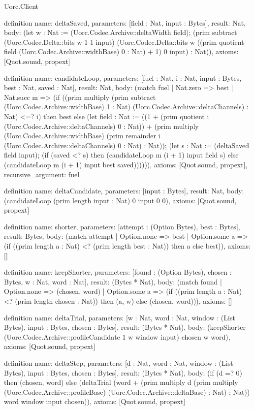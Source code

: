 \begin{lexlean}{Uorc.Client}
\begin{semanticmodule}
definition{
  name: deltaSaved,
  parameters: [field : Nat, input : Bytes],
  result: Nat,
  body: (let w : Nat := (Uorc.Codec.Archive::deltaWidth field); (prim subtract (Uorc.Codec.Delta::bits w 1 1 input) (Uorc.Codec.Delta::bits w ((prim quotient field (Uorc.Codec.Archive::widthBase) 0 : Nat) + 1) 0 input) : Nat)),
  axioms: [Quot.sound, propext]
}

definition{
  name: candidateLoop,
  parameters: [fuel : Nat, i : Nat, input : Bytes, best : Nat, saved : Nat],
  result: Nat,
  body: (match fuel
    | Nat.zero => best
    | Nat.succ m => (if ((prim multiply (prim subtract (Uorc.Codec.Archive::widthBase) 1 : Nat) (Uorc.Codec.Archive::deltaChannels) : Nat) <=? i) then best else (let field : Nat := ((1 + (prim quotient i (Uorc.Codec.Archive::deltaChannels) 0 : Nat)) + (prim multiply (Uorc.Codec.Archive::widthBase) (prim remainder i (Uorc.Codec.Archive::deltaChannels) 0 : Nat) : Nat)); (let s : Nat := (deltaSaved field input); (if (saved <? s) then (candidateLoop m (i + 1) input field s) else (candidateLoop m (i + 1) input best saved)))))),
  axioms: [Quot.sound, propext],
  recursive_argument: fuel
}

definition{
  name: deltaCandidate,
  parameters: [input : Bytes],
  result: Nat,
  body: (candidateLoop (prim length input : Nat) 0 input 0 0),
  axioms: [Quot.sound, propext]
}

definition{
  name: shorter,
  parameters: [attempt : (Option Bytes), best : Bytes],
  result: Bytes,
  body: (match attempt
    | Option.none => best
    | Option.some a => (if ((prim length a : Nat) <? (prim length best : Nat)) then a else best)),
  axioms: []
}

definition{
  name: keepShorter,
  parameters: [found : (Option Bytes), chosen : Bytes, w : Nat, word : Nat],
  result: (Bytes * Nat),
  body: (match found
    | Option.none => (chosen, word)
    | Option.some a => (if ((prim length a : Nat) <? (prim length chosen : Nat)) then (a, w) else (chosen, word))),
  axioms: []
}

definition{
  name: deltaTrial,
  parameters: [w : Nat, word : Nat, window : (List Bytes), input : Bytes, chosen : Bytes],
  result: (Bytes * Nat),
  body: (keepShorter (Uorc.Codec.Archive::profileCandidate 1 w window input) chosen w word),
  axioms: [Quot.sound, propext]
}

definition{
  name: deltaStep,
  parameters: [d : Nat, word : Nat, window : (List Bytes), input : Bytes, chosen : Bytes],
  result: (Bytes * Nat),
  body: (if (d =? 0) then (chosen, word) else (deltaTrial (word + (prim multiply d (prim multiply (Uorc.Codec.Archive::profileBase) (Uorc.Codec.Archive::deltaBase) : Nat) : Nat)) word window input chosen)),
  axioms: [Quot.sound, propext]
}


\end{semanticmodule}
\end{lexlean}
